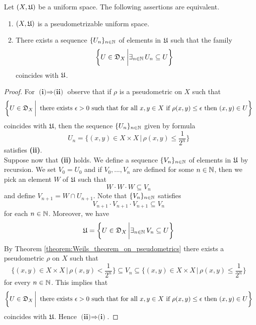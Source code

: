 \begin{theorem}\label{theorem:characterization_of_pseudometrizable_uniform_spaces}
Let $(X,{\mathfrak U})$ be a uniform space. The following assertions are equivalent.
\begin{enumerate}[label=\emph{\textbf{(\roman*)}}, leftmargin=*]
\item $(X,{\mathfrak U})$ is a pseudometrizable uniform space.
\item There exists a sequence $\{U_n\}_{n\in {\mathbb N}}$ of elements in ${\mathfrak U}$ such that the family
$$\bigg\{U\in {\mathfrak D}_{X}\,\bigg|\exists_{n\in {\mathbb N}}\,U_n \subseteq U\bigg\}$$
coincides with ${\mathfrak U}$.
\end{enumerate}
\end{theorem}
\begin{proof}
For $\textbf{(i)}\Rightarrow \textbf{(ii)}$ observe that if $\rho$ is a pseudometric on $X$ such that 
$$\bigg\{U \in {\mathfrak D}_{X}\,\bigg|\,\mbox{ there exists }\epsilon>0\mbox{ such that for all }x,y\in X\mbox{ if }\rho(x,y)\leq \epsilon\mbox{ then }(x,y)\in U\bigg\}$$
coincides with ${\mathfrak U}$, then the sequence $\{U_n\}_{n\in {\mathbb N}}$ given by formula
$$U_n = \bigg\{(x,y)\in X\times X\,\bigg|\,\rho(x,y) \leq \frac{1}{2^n}\bigg\}$$
satisfies \textbf{(ii)}.\\
Suppose now that \textbf{(ii)} holds. We define a sequence $\{V_n\}_{n\in {\mathbb N}}$ of elements in ${\mathfrak U}$ by recursion. We set $V_0 = U_0$ and if $V_0,...,V_n$ are defined for some $n\in {\mathbb N}$, then we pick an element $W$ of ${\mathfrak U}$ such that 
$$W\cdot W\cdot W \subseteq V_n$$
and define $V_{n+1} = W\cap U_{n+1}$. Note that $\{V_n\}_{n\in {\mathbb N}}$ satisfies
$$V_{n+1}\cdot V_{n+1}\cdot V_{n+1} \subseteq V_n$$
for each $n\in {\mathbb N}$. Moreover, we have
$${\mathfrak U} = \bigg\{U\in {\mathfrak D}_{X}\,\bigg|\exists_{n\in {\mathbb N}}\,V_n \subseteq U\bigg\}$$
By Theorem \ref{theorem:Weils_theorem_on_pseudometrics} there exists a pseudometric $\rho$ on $X$ such that
$$\bigg\{(x,y)\in X\times X\,\bigg|\,\rho(x,y)<\frac{1}{2^n}\bigg\} \subseteq V_n \subseteq \bigg\{(x,y)\in X\times X\,\bigg|\,\rho(x,y) \leq \frac{1}{2^n}\bigg\}$$
for every $n\in {\mathbb N}$. This implies that
$$\bigg\{U \in {\mathfrak D}_{X}\,\bigg|\,\mbox{ there exists }\epsilon>0\mbox{ such that for all }x,y\in X\mbox{ if }\rho(x,y)\leq \epsilon\mbox{ then }(x,y)\in U\bigg\}$$
coincides with ${\mathfrak U}$. Hence $\textbf{(ii)}\Rightarrow \textbf{(i)}$.
\end{proof}

